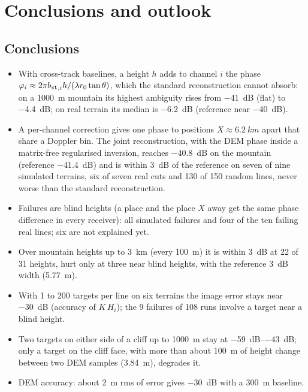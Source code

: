\chapter{Conclusions and outlook}\label{ch:conclusions}

\section{Conclusions}

\begin{itemize}
  \item With cross-track baselines, a height $h$ adds to channel $i$ the phase
        $\varphi_i\approx 2\pi{b_{\mathrm{xt}}}_{,i}h/(\lambda r_0\tan\theta)$, which the standard reconstruction cannot absorb: on a
        \SI{1000}{m} mountain its highest ambiguity rises from \SI{-41}{dB} (flat) to \SI{-4.4}{dB}; on real terrain its
        median is \SI{-6.2}{dB} (reference near \SI{-40}{dB}).
  \item A per-channel correction gives one phase to positions $X\approx\SI{6.2}{km}$ apart that share a Doppler bin. The
        joint reconstruction, with the DEM phase inside a matrix-free regularised inversion, reaches \SI{-40.8}{dB} on the
        mountain (reference \SI{-41.4}{dB}) and is within \SI{3}{dB} of the reference on seven of nine simulated terrains,
        six of seven real cuts and 130 of 150 random lines, never worse than the standard reconstruction.
  \item Failures are blind heights (a place and the place $X$ away get the same phase difference in every receiver): all
        simulated failures and four of the ten failing real lines; six are not explained yet.
  \item Over mountain heights up to \SI{3}{km} (every \SI{100}{m}) it is within \SI{3}{dB} at 22 of 31 heights, hurt only at
        three near blind heights, with the reference \SI{3}{dB} width (\SI{5.77}{m}).
  \item With 1 to 200 targets per line on six terrains the image error stays near \SI{-30}{dB} (accuracy of $K\,H_i$);
        the 9 failures of 108 runs involve a target near a blind height.
  \item Two targets on either side of a cliff up to \SI{1000}{m} stay at \SIrange{-59}{-43}{dB}; only a target on the cliff
        face, with more than about \SI{100}{m} of height change between two DEM samples (\SI{3.84}{m}), degrades it.
  \item DEM accuracy: about \SI{2}{m} rms of error gives \SI{-30}{dB} with a \SI{300}{m} baseline.

\end{itemize}
